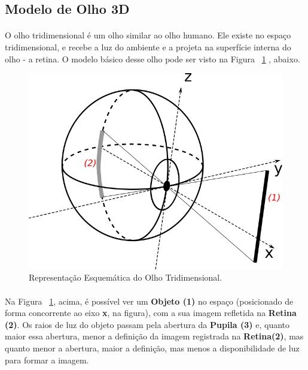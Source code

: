 \documentclass{article}
\begin{document}
	\subsection{Modelo de Olho 3D} \label{mo3d}
	\paragraph{}
	O olho tridimensional é um olho similar ao olho humano. Ele existe no espaço tridimensional, e recebe a luz do ambiente e a projeta na superfície interna do olho - a retina. O modelo básico desse olho pode ser visto na Figura ~\ref{fig:Olho3D} , abaixo.
	
	\begin{figure}[h]
		\centering
		\includegraphics[scale=0.5]{Olho-Tridimensional}
		\caption{Representação Esquemática do Olho Tridimensional.}
		\label{fig:Olho3D}
	\end{figure}

	\paragraph{}
	Na Figura ~\ref{fig:Olho3D}, acima, é possível ver um  \textbf{Objeto (1)} no espaço (posicionado de forma concorrente ao eixo \textbf{x}, na figura), com a sua imagem refletida na \textbf{Retina (2)}. Os raios de luz do objeto passam pela abertura da \textbf{Pupila (3)} e, quanto maior essa abertura, menor a definição da imagem registrada na \textbf{Retina(2)}, mas quanto menor a abertura, maior a definição, mas menos a disponibilidade de luz para formar a imagem.
	
\end{document}
